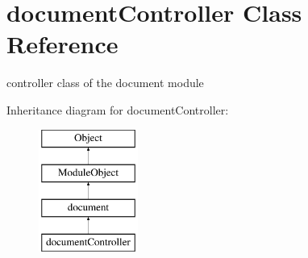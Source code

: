 \hypertarget{classdocumentController}{\section{document\-Controller Class Reference}
\label{classdocumentController}
}


controller class of the document module  


Inheritance diagram for document\-Controller\-:\begin{figure}[H]
\begin{center}
\leavevmode
\includegraphics[height=4.000000cm]{classdocumentController}
\end{center}
\end{figure}
